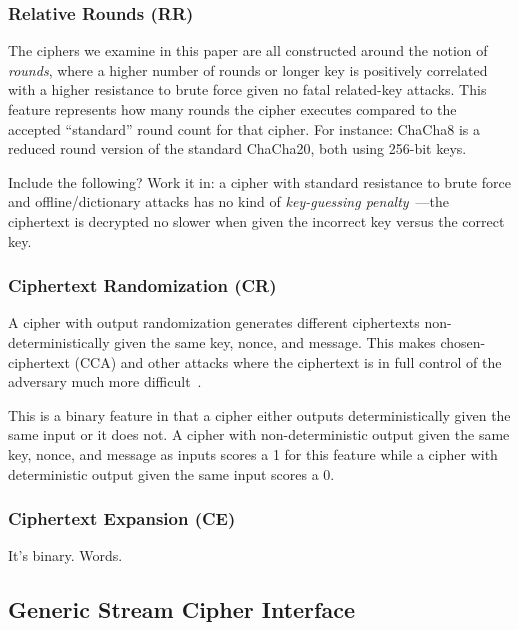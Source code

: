 \subsubsection{Relative Rounds (RR)}

The ciphers we examine in this paper are all constructed around the notion of
\emph{rounds}, where a higher number of rounds or longer key is positively
correlated with a higher resistance to brute force given no fatal related-key
attacks. This feature represents how many rounds the cipher executes compared to
the accepted ``standard'' round count for that cipher. For instance: ChaCha8 is
a reduced round version of the standard ChaCha20, both using 256-bit keys.

Include the following? Work it in: a cipher with standard resistance to brute
force and offline/dictionary attacks has no kind of \emph{key-guessing
penalty}~\cite{Freestyle}---the ciphertext is decrypted no slower when given the
incorrect key versus the correct key.

\subsubsection{Ciphertext Randomization (CR)}

A cipher with output randomization generates different ciphertexts
non-\\deterministically given the same key, nonce, and message. This makes
chosen-ciphertext (CCA) and other attacks where the ciphertext is in full
control of the adversary much more difficult~\cite{Freestyle}.

This is a binary feature in that a cipher either outputs deterministically given
the same input or it does not. A cipher with non-deterministic output given the
same key, nonce, and message as inputs scores a 1 for this feature while a
cipher with deterministic output given the same input scores a 0.

\subsubsection{Ciphertext Expansion (CE)}

It's binary. Words.

\subsection{Generic Stream Cipher Interface} \label{subsec:interface}

